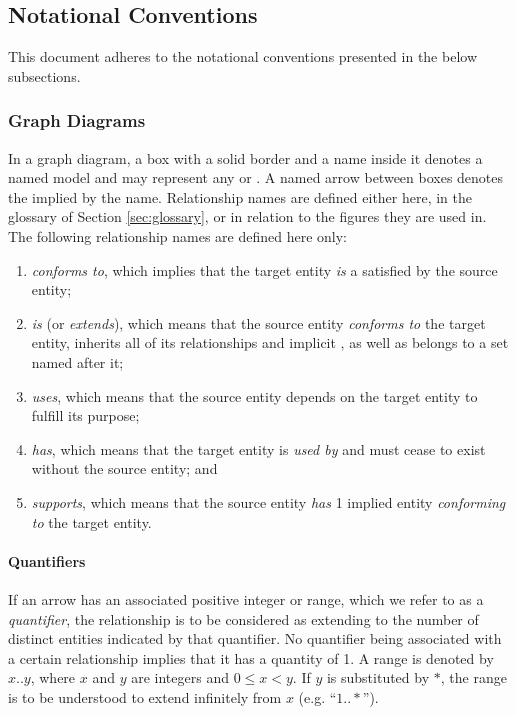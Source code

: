 \newpage

\subsection{Notational Conventions}
\label{sec:introduction:conventions}

This document adheres to the notational conventions presented in the below subsections.

\subsubsection{Graph Diagrams}
\label{sec:introduction:conventions:graphs}

In a graph diagram, a box with a solid border and a name inside it denotes a named model  and may represent any  or .
A named arrow between boxes denotes the  implied by the name.
Relationship names are defined either here, in the glossary of Section \ref{sec:glossary}, or in relation to the figures they are used in.
The following relationship names are defined here only:

\begin{enumerate}
\item \textit{conforms to}, which implies that the target entity \textit{is} a  satisfied by the source entity;
\item \textit{is} (or \textit{extends}), which means that the source entity \textit{conforms to} the target entity, inherits all of its relationships and implicit , as well as belongs to a set named after it;
\item \textit{uses}, which means that the source entity depends on the target entity to fulfill its purpose;
\item \textit{has}, which means that the target entity is \textit{used by} and must cease to exist without the source entity; and
\item \textit{supports}, which means that the source entity \textit{has} 1 implied entity \textit{conforming to} the target entity.
\end{enumerate}

\paragraph{Quantifiers}
If an arrow has an associated positive integer or range, which we refer to as a \textit{quantifier}, the relationship is to be considered as extending to the number of distinct entities indicated by that quantifier.
No quantifier being associated with a certain relationship implies that it has a quantity of 1.
A range is denoted by $x..y$, where $x$ and $y$ are integers and $0 \leq x < y$.
If $y$ is substituted by $*$, the range is to be understood to extend infinitely from $x$ (e.g. ``$1..*$'').

